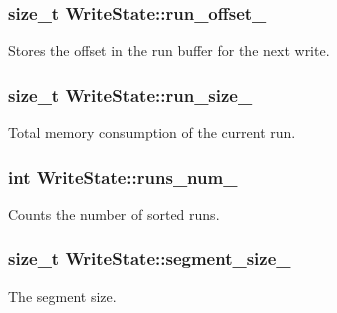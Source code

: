 \subsubsection[{run\+\_\+offset\+\_\+}]{\setlength{\rightskip}{0pt plus 5cm}size\+\_\+t Write\+State\+::run\+\_\+offset\+\_\+\hspace{0.3cm}{\ttfamily [private]}}\label{classWriteState_aa81ec074dba266202c72f1dc5b34d28a}
Stores the offset in the run buffer for the next write. \hypertarget{classWriteState_a77bff60be493ad28638135d43f4929c5}{}
\subsubsection[{run\+\_\+size\+\_\+}]{\setlength{\rightskip}{0pt plus 5cm}size\+\_\+t Write\+State\+::run\+\_\+size\+\_\+\hspace{0.3cm}{\ttfamily [private]}}\label{classWriteState_a77bff60be493ad28638135d43f4929c5}
Total memory consumption of the current run. \hypertarget{classWriteState_a6c1e55b3b77f064ada008f83f61ceb51}{}
\subsubsection[{runs\+\_\+num\+\_\+}]{\setlength{\rightskip}{0pt plus 5cm}int Write\+State\+::runs\+\_\+num\+\_\+\hspace{0.3cm}{\ttfamily [private]}}\label{classWriteState_a6c1e55b3b77f064ada008f83f61ceb51}
Counts the number of sorted runs. \hypertarget{classWriteState_a16f11023373160d16b4f7d55d28ec3ac}{}
\subsubsection[{segment\+\_\+size\+\_\+}]{\setlength{\rightskip}{0pt plus 5cm}size\+\_\+t Write\+State\+::segment\+\_\+size\+\_\+\hspace{0.3cm}{\ttfamily [private]}}\label{classWriteState_a16f11023373160d16b4f7d55d28ec3ac}
The segment size. \hypertarget{classWriteState_a45a9a04b9520ed82c87322acfa94a72c}{}
